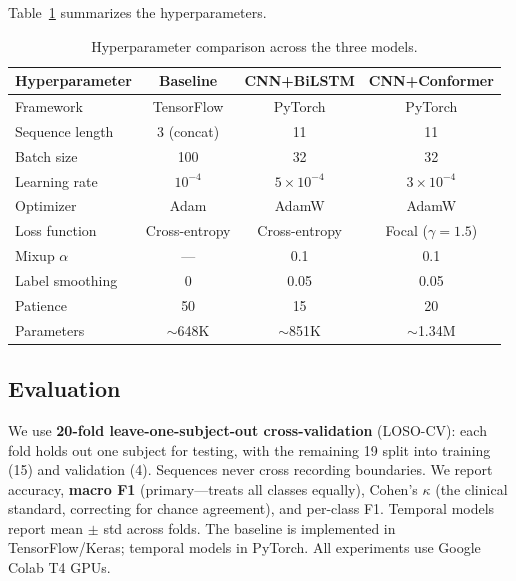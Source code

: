 \documentclass[final]{article}
\begin{document}
Table~\ref{tab:hyperparams} summarizes the hyperparameters.

\begin{table}[t]
\caption{Hyperparameter comparison across the three models.}
\label{tab:hyperparams}
\centering
\small
\begin{tabular}{lccc}
\toprule
\textbf{Hyperparameter} & \textbf{Baseline} & \textbf{CNN+BiLSTM} & \textbf{CNN+Conformer} \\
\midrule
Framework        & TensorFlow   & PyTorch     & PyTorch \\
Sequence length  & 3 (concat)   & 11          & 11 \\
Batch size       & 100          & 32          & 32 \\
Learning rate    & $10^{-4}$    & $5 \times 10^{-4}$ & $3 \times 10^{-4}$ \\
Optimizer        & Adam         & AdamW       & AdamW \\
Loss function    & Cross-entropy & Cross-entropy & Focal ($\gamma\!=\!1.5$) \\
Mixup $\alpha$   & ---          & 0.1         & 0.1 \\
Label smoothing  & 0            & 0.05        & 0.05 \\
Patience         & 50           & 15          & 20 \\
Parameters       & $\sim$648K   & $\sim$851K  & $\sim$1.34M \\
\bottomrule
\end{tabular}
\end{table}

\subsection{Evaluation}

We use \textbf{20-fold leave-one-subject-out cross-validation} (LOSO-CV): each fold holds out one subject for testing, with the remaining 19 split into training (15) and validation (4). Sequences never cross recording boundaries. We report accuracy, \textbf{macro F1} (primary---treats all classes equally), Cohen's $\kappa$ (the clinical standard, correcting for chance agreement), and per-class F1. Temporal models report mean $\pm$ std across folds. The baseline is implemented in TensorFlow/Keras; temporal models in PyTorch. All experiments use Google Colab T4 GPUs.

\end{document}
